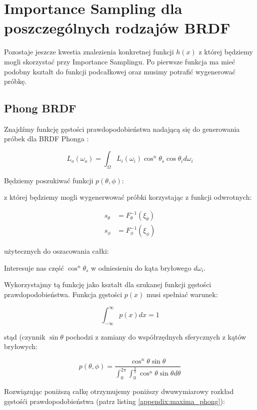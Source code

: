 \documentclass[../main.tex]{subfiles}
\begin{document}
\section{Importance Sampling dla poszczególnych rodzajów BRDF}

Pozostaje jeszcze kwestia znalezienia konkretnej funkcji $h(x)$ z której
będziemy mogli skorzystać przy Importance Samplingu. Po pierwsze funkcja
ma mieć podobny kształt do funkcji podcałkowej oraz musimy potrafić wygenerować
próbkę.

\subsection{Phong BRDF}

Znajdźmy funkcję gęstości prawdopodobieństwa nadającą się do generowania próbek
dla BRDF Phonga
  \cite{NotesImportanceSampling} \cite{ImportanceSamplingForProduction}:

\[
  L_o(\omega_o) = \int_{\Omega} {
    L_i(\omega_i) \cos^{n}\theta_s \cos\theta_i d\omega_i
  }
\]

Będziemy poszukiwać funkcji $p(\theta, \phi)$:

\noindent z której będziemy mogli wygenerwować próbki korzystając z funkcji
odwrotnych:

\begin{align*}
  s_\theta &= F_{\theta}^{-1}(\xi_\theta) \\
  s_\phi &= F_{\phi}^{-1}(\xi_\phi)
\end{align*}

\noindent użytecznych do oszacowania całki:

Interesuje nas część $\cos^{n}\theta_s$ w odniesieniu do kąta bryłowego
$d\omega_i$.

Wykorzystajmy tą funkcję jako kształt dla szukanej funkcji gęstości
prawdopodobieństwa. Funkcja gęstości $p(x)$ musi spełniać warunek:

\[ \int_{-\infty}^{\infty} p(x) dx = 1 \]

\noindent stąd (czynnik $\sin\theta$ pochodzi z zamiany do współrzędnych
sferycznych z kątów bryłowych:

\[
  p(\theta, \phi) = \frac{
    \cos^{n}{\theta} \sin\theta
  }{
    \int_{0}^{2\pi} \int_{0}^{\frac{\pi}{2}} {
      \cos^{n}{\theta} \sin\theta d\theta
    }
  }
\]

Rozwiązując poniższą całkę otrzymujemy poniższy dwuwymiarowy rozkład gęstośći
prawdopodobieństwa (patrz listing \ref{appendix:maxima_phong}):
\end{document}
